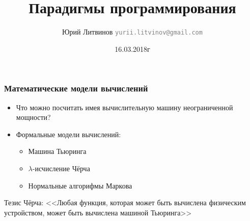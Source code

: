 \documentclass[xetex,mathserif,serif]{beamer}
\title{Парадигмы программирования}
\author[Юрий Литвинов]{Юрий Литвинов \newline \textcolor{gray}{\small\texttt{yurii.litvinov@gmail.com}}}
\date{16.03.2018г}
\begin{document}
	
	\frame{\titlepage}

	\begin{frame}
		\frametitle{Математические модели вычислений}
		\begin{itemize}
			\item Что можно посчитать имея вычислительную машину неограниченной мощности?
			\item Формальные модели вычислений:
			\begin{itemize}
				\item Машина Тьюринга
				\item $\lambda$-исчисление Чёрча
				\item Нормальные алгорифмы Маркова
			\end{itemize}
		\end{itemize}
		Тезис Чёрча: <<Любая функция, которая может быть вычислена физическим устройством, может быть вычислена машиной Тьюринга>>
	\end{frame}
\end{document}
